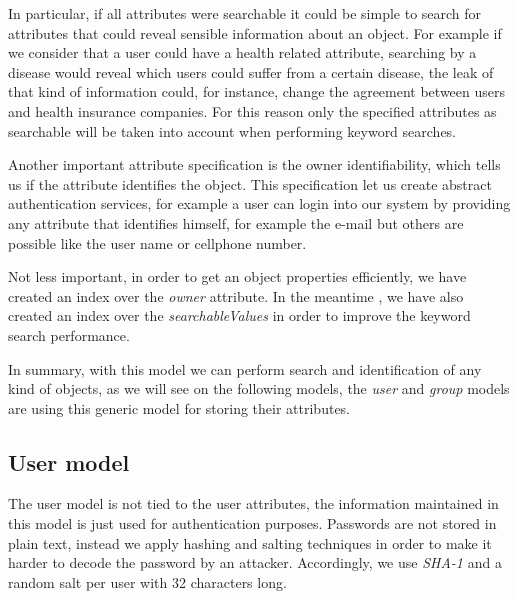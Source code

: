 In particular, if all attributes were searchable it could be simple to search for attributes that could reveal sensible information about an object. For example if we consider that a user could have a health related attribute, searching by a disease would reveal which users could suffer from a certain disease, the leak of that kind of information could, for instance, change the agreement between users and health insurance companies. For this reason only the specified attributes as searchable will be taken into account when performing keyword searches.

Another important attribute specification is the owner identifiability, which tells us if the attribute identifies the object. This specification let us create abstract authentication services, for example a user can login into our system by providing any attribute that identifies himself, for example the e-mail but others are possible like the user name or cellphone number. 

Not less important, in order to get an object properties efficiently, we have created an index over the \emph{owner} attribute. In the meantime , we have also created an index over the \emph{searchableValues} in order to improve the keyword search performance.

In summary, with this model we can perform search and identification of any kind of objects, as we will see on the following models, the \emph{user} and \emph{group} models are using this generic model for storing their attributes. 


\subsection{User model}

The user model is not tied to the user attributes, the information maintained in this model is just used for authentication purposes. Passwords are not stored in plain text, instead we apply hashing and salting techniques \cite{password} in order to make it harder to decode the password by an attacker. Accordingly, we use \emph{SHA-1} and a random salt per user with 32 characters long.

